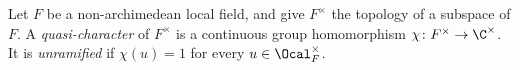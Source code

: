 Let $F$ be a non-archimedean local field, and give $F^\times$ the topology of a subspace of $F$. A
\emph{quasi-character} of $F^\times$ is a continuous group homomorphism $\chi\colon F^\times\to\C^\times$. It is
\emph{unramified} if $\chi(u)=1$ for every $u\in\Ocal_F^\times$.
